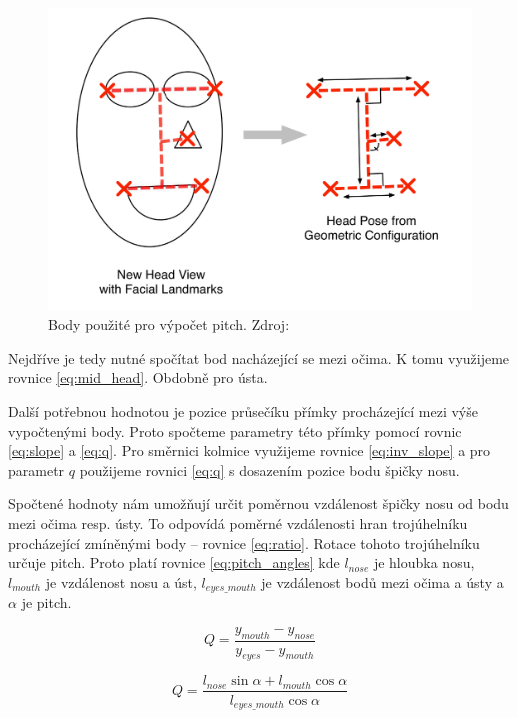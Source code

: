 \documentclass[12pt,a4paper,titlepage,final]{report}
\begin{document}
\begin{figure}[H]
    \centering
    \includegraphics[scale=0.3]{images/pitch_geom.png}
    \caption{Body použité pro výpočet pitch. Zdroj: \cite{murphy-chutorian_trivedi_2009}}
    \label{fig:pitch}
\end{figure}

Nejdříve je tedy nutné spočítat bod nacházející se mezi očima. K tomu využijeme rovnice \ref{eq:mid_head}. Obdobně pro ústa. 

Další potřebnou hodnotou je pozice průsečíku přímky procházející mezi výše vypočtenými body. Proto spočteme parametry této přímky pomocí rovnic \ref{eq:slope} a \ref{eq:q}. Pro směrnici kolmice využijeme rovnice \ref{eq:inv_slope} a pro parametr $q$ použijeme rovnici \ref{eq:q} s dosazením pozice bodu špičky nosu.

Spočtené hodnoty nám umožňují určit poměrnou vzdálenost špičky nosu od bodu mezi očima resp. ústy. To odpovídá poměrné vzdálenosti hran trojúhelníku procházející zmíněnými body -- rovnice \ref{eq:ratio}. Rotace tohoto trojúhelníku určuje pitch. Proto platí rovnice \ref{eq:pitch_angles} kde $l_{nose}$ je hloubka nosu, $l_{mouth}$ je vzdálenost nosu a úst,  $l_{eyes\_mouth}$ je vzdálenost bodů mezi očima a ústy a $\alpha$ je pitch.

\begin{equation}\label{eq:ratio}
Q = \frac{y_{mouth} - y_{nose}}{y_{eyes} - y_{mouth}}
\end{equation}

\begin{equation}\label{eq:pitch_angles}
Q = \frac{l_{nose}\sin{\alpha} + l_{mouth}\cos{\alpha}}{l_{eyes\_mouth}\cos{\alpha}}
\end{equation}
\end{document}
